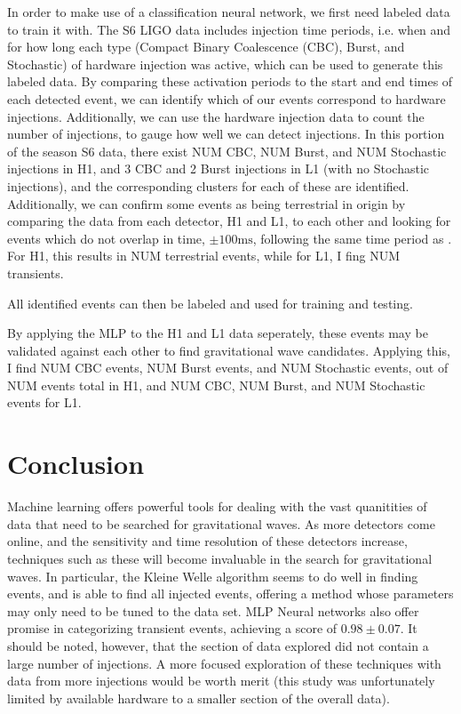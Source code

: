 \documentclass{article}
\begin{document}
In order to make use of a classification neural network, we first need labeled data to train it with. The S6 LIGO data includes injection time periods, i.e. when and for how long each type (Compact Binary Coalescence (CBC), Burst, and Stochastic) of hardware injection was active, which can be used to generate this labeled data. By comparing these activation periods to the start and end times of each detected event, we can identify which of our events correspond to hardware injections. Additionally, we can use the hardware injection data to count the number of injections, to gauge how well we can detect injections. In this portion of the season S6 data, there exist NUM CBC, NUM Burst, and NUM Stochastic injections in H1, and 3 CBC and 2 Burst injections in L1 (with no Stochastic injections), and the corresponding clusters for each of these are identified. Additionally, we can confirm some events as being terrestrial in origin by comparing the data from each detector, H1 and L1, to each other and looking for events which do not overlap in time, $\pm100\mathrm{ms}$, following the same time period as \citet{Biswas2013}. For H1, this results in NUM terrestrial events, while for L1, I fing NUM transients.

All identified events can then be labeled and used for training and testing. 

By applying the MLP to the H1 and L1 data seperately, these events may be validated against each other to find gravitational wave candidates. Applying this, I find NUM CBC events, NUM Burst events, and NUM Stochastic events, out of NUM events total in H1, and NUM CBC, NUM Burst, and NUM Stochastic events for L1. 

\section{Conclusion}
Machine learning offers powerful tools for dealing with the vast quanitities of data that need to be searched for gravitational waves. As more detectors come online, and the sensitivity and time resolution of these detectors increase, techniques such as these will become invaluable in the search for gravitational waves. In particular, the Kleine Welle algorithm seems to do well in finding events, and is able to find all injected events, offering a method whose parameters may only need to be tuned to the data set. MLP Neural networks also offer promise in categorizing transient events, achieving a score of $0.98\pm0.07$. It should be noted, however, that the section of data explored did not contain a large number of injections. A more focused exploration of these techniques with data from more injections would be worth merit (this study was unfortunately limited by available hardware to a smaller section of the overall data).



\end{document}
